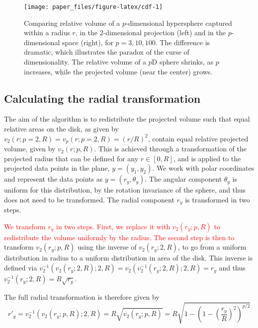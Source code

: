 \documentclass[]{interact}
\theoremstyle{plain}%
\theoremstyle{definition}
\theoremstyle{remark}
\begin{document}
\begin{figure}

{\centering \texttt{[image: paper\_files/figure-latex/cdf-1]} 

}

\caption{Comparing relative volume of a $p$-dimensional hypersphere captured within a radius $r$, in the 2-dimensional projection (left) and in the $p$-dimensional space (right), for $p=3, 10, 100$. The difference is dramatic, which illustrates the paradox of the curse of dimensionality. The relative volume of a $p$D sphere shrinks, as $p$ increases, while the projected volume (near the center) grows.}\label{fig:cdf}
\end{figure}

\hypertarget{calculating-the-radial-transformation}{%
\subsection{Calculating the radial
transformation}\label{calculating-the-radial-transformation}}

The aim of the algorithm is to redistribute the projected volume such
that equal relative areas on the disk, as given by
\(v_{2} (r; p=2, R)= v_p(r; p=2, R) = (r/R)^2\), contain equal relative
projected volume, given by \(v_{2} (r; p, R)\). This is achieved through
a transformation of the projected radius that can be defined for any
\(r\in[0,R]\), and is applied to the projected data points in the plane,
\(y = (y_1, y_2)\). We work with polar coordinates and represent the
data points as \(y = (r_y, \theta_y)\). The angular component
\(\theta_y\) is uniform for this distribution, by the rotation
invariance of the sphere, and thus does not need to be transformed. The
radial component \(r_y\) is transformed in two steps.

\textcolor{red}{We transform $r_y$ in two steps. First, we replace it with $v_{2} (r_y; p, R)$ to redistribute the volume uniformly by the radius. The second step is then to }
transform \(v_{2} (r_y; p, R)\) using the inverse of
\(v_{2} (r_y; 2, R)\), to go from a uniform distribution in radius to a
uniform distribution in area of the disk. This inverse is defined via
\(v_2^{-1}(v_2(r_y; 2, R); 2, R) = v_2(v_2^{-1}(r_y; 2, R); 2, R) = r_y\)
and thus \(v_2^{-1}(r_y; 2, R) = R \sqrt{r_y}\).

The full radial transformation is therefore given by \begin{equation}
r'_y = v_2^{-1} (v_2(r_y; p, R); 2, R) =  R \sqrt{v_2(r_y; p, R)} = R \sqrt{1-\left(1-\left(\frac{r_y}{R}\right)^2\right)^{p/2}}
\label{eq:resc}
\end{equation}
\end{document}
